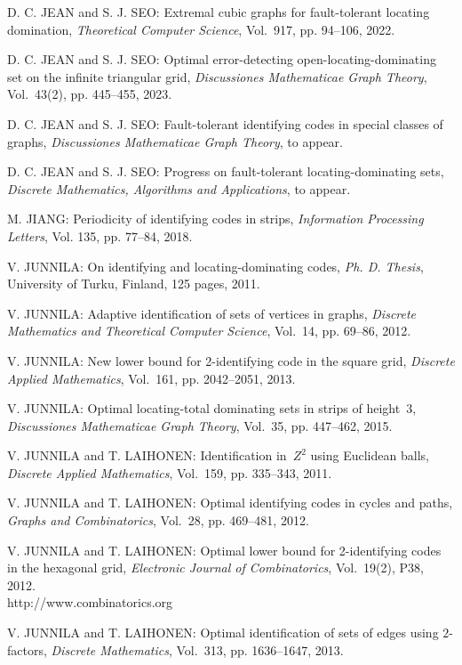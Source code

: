 \begin{thebibliography}{999}
D. C. JEAN and S. J. SEO: Extremal cubic graphs for fault-tolerant locating domination, {\it Theoretical Computer Science}, Vol.~917, pp. 94--106, 2022.

D. C. JEAN and S. J. SEO: Optimal error-detecting open-locating-dominating set on the infinite triangular grid, {\it Discussiones Mathematicae Graph Theory}, Vol.~43(2), pp. 445--455, 2023.

D. C. JEAN and S. J. SEO: Fault-tolerant identifying codes in special classes of graphs, {\it Discussiones Mathematicae Graph Theory}, to appear.

D. C. JEAN and S. J. SEO: Progress on fault-tolerant locating-dominating sets, {\it Discrete Mathematics, Algorithms and Applications}, to appear.

M. JIANG: Periodicity of identifying codes in strips, {\it Information Processing Letters}, Vol. 135, pp. 77--84, 2018.

V. JUNNILA: On identifying and locating-dominating codes, {\it Ph. D. Thesis}, University of Turku, Finland, 125 pages, 2011.

V. JUNNILA: Adaptive identification of sets of vertices in graphs, {\it Discrete Mathematics and Theoretical Computer Science}, Vol.~14, pp. 69--86, 2012.

V. JUNNILA: New lower bound for 2-identifying code in the square grid, {\it Discrete Applied Mathematics}, Vol.~161, pp. 2042--2051, 2013.

V. JUNNILA: Optimal locating-total dominating sets in strips of height~3, {\it Discussiones Mathematicae Graph Theory}, Vol.~35, pp. 447--462, 2015.

V. JUNNILA and T. LAIHONEN: Identification in~$Z^2$ using Euclidean balls, {\it Discrete Applied Mathematics}, Vol.~159, pp. 335--343, 2011.

V. JUNNILA and T. LAIHONEN: Optimal identifying codes in cycles and paths, {\it Graphs and Combinatorics}, Vol.~28, pp. 469--481, 2012.

V. JUNNILA and T. LAIHONEN: Optimal lower bound for 2-identifying codes in the hexagonal grid, {\it Electronic Journal of Combinatorics}, Vol.~19(2), P38, 2012.\\
http://www.combinatorics.org

V. JUNNILA and T. LAIHONEN: Optimal identification of sets of edges using $2$-factors, {\it Discrete Mathematics}, Vol.~313, pp. 1636--1647, 2013.


\end{thebibliography}
